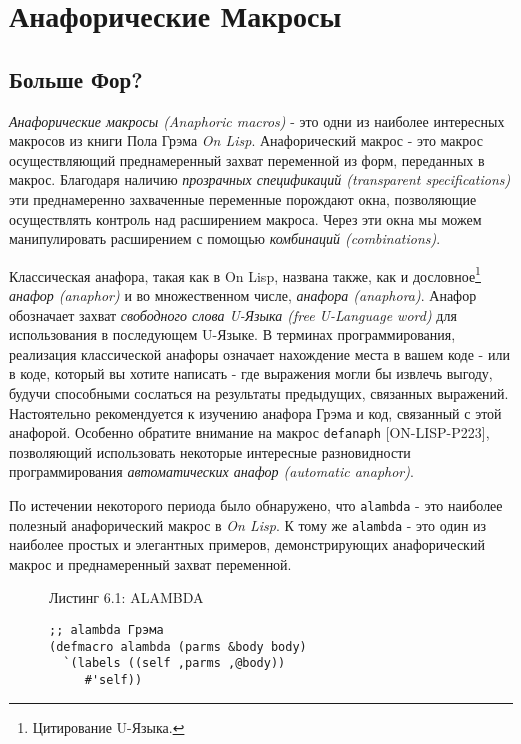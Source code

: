 \chapter{Анафорические Макросы}\label{chapter_anaphoric_macros}
\section{Больше Фор?}\label{section_more_phors?}


\emph{Анафорические макросы (Anaphoric macros)} - это одни из наиболее интересных макросов из книги Пола Грэма \emph{On Lisp}. Анафорический макрос - это макрос осуществляющий преднамеренный захват переменной из форм, переданных в макрос. Благодаря наличию \emph{прозрачных спецификаций (transparent specifications)} эти преднамеренно захваченные переменные порождают окна, позволяющие осуществлять контроль над расширением макроса. Через эти окна мы можем манипулировать расширением с помощью \emph{комбинаций (combinations)}.

Классическая анафора, такая как в On Lisp, названа также, как и дословное\footnote{Цитирование U-Языка.} \emph{анафор (anaphor)} и во множественном числе, \emph{анафора (ana\-pho\-ra)}. Анафор обозначает захват \emph{свободного слова U-Языка (free U-Language word)} для использования в последующем U-Языке. В терминах программирования, реализация классической анафоры означает нахождение места в вашем коде - или в коде, который вы хотите написать - где выражения могли бы извлечь выгоду, будучи способными сослаться на результаты предыдущих, связанных выражений. Настоятельно рекомендуется к изучению анафора Грэма и код, связанный с этой анафорой. Особенно обратите внимание на макрос \verb"defanaph" [ON-LISP-P223], позволяющий использовать некоторые интересные разновидности программирования \emph{автоматических анафор (automatic anaphor)}.



По истечении некоторого периода было обнаружено, что \verb"alambda" - это наиболее полезный анафорический макрос в \emph{On Lisp}. К тому же \verb"alambda" - это один из наиболее простых и элегантных примеров, демонстрирующих анафорический макрос и преднамеренный захват переменной.

\begin{figure}Листинг 6.1: ALAMBDA\label{listing_6.1}
\listbegin
\begin{verbatim}
;; alambda Грэма
(defmacro alambda (parms &body body)
  `(labels ((self ,parms ,@body))
     #'self))
\end{verbatim}
\listend
\end{figure}

